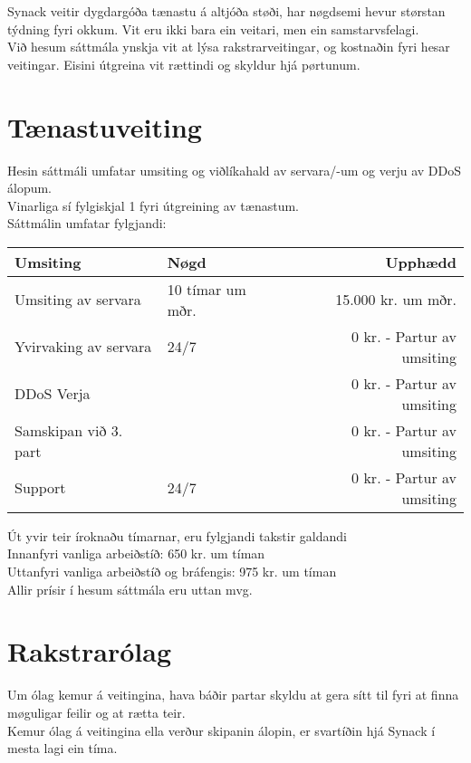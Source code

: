 Synack veitir dygdargóða tænastu á altjóða støði, har nøgdsemi hevur størstan týdning fyri okkum.
Vit eru ikki bara ein veitari, men ein samstarvsfelagi. \\

Við hesum sáttmála ynskja vit at lýsa rakstrarveitingar, og kostnaðin fyri hesar veitingar. Eisini
útgreina vit rættindi og skyldur hjá pørtunum. \\

\section*{Tænastuveiting}
Hesin sáttmáli umfatar umsiting og viðlíkahald av servara/-um og verju av DDoS álopum. \\
Vinarliga sí fylgiskjal 1 fyri útgreining av tænastum. \\

\noindent
Sáttmálin umfatar fylgjandi: \\
\begin{center}
	\begin{tabular}{|l|l|r|} \hline
		\textbf{Umsiting}		& \textbf{Nøgd}			& \textbf{Upphædd}				\\ \hline
		Umsiting av servara		& 10 tímar um mðr.		& 15.000 kr. um mðr.			\\ \hline
		Yvirvaking av servara	& 24/7					& 0 kr. - Partur av umsiting	\\ \hline
		DDoS Verja				&						& 0 kr. - Partur av umsiting	\\ \hline
		Samskipan við 3. part	& 						& 0 kr. - Partur av umsiting	\\ \hline
		Support					& 24/7					& 0 kr. - Partur av umsiting	\\ \hline
	\end{tabular}
\end{center}

\noindent
Út yvir teir íroknaðu tímarnar, eru fylgjandi takstir galdandi \\

\noindent
Innanfyri vanliga arbeiðstíð: 650 kr. um tíman \\
Uttanfyri vanliga arbeiðstíð og bráfengis: 975 kr. um tíman \\

\noindent
Allir prísir í hesum sáttmála eru uttan mvg.

\section*{Rakstrarólag}
Um ólag kemur á veitingina, hava báðir partar skyldu at gera sítt til fyri at finna møguligar feilir og at
rætta teir. \\
Kemur ólag á veitingina ella verður skipanin álopin, er svartíðin hjá Synack í mesta lagi ein tíma. \\

